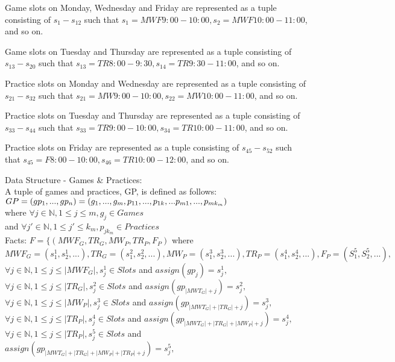 \documentclass[12 pt]{article}        	%
\begin{document}
Game slots on Monday, Wednesday and Friday are represented as a tuple consisting of $s_1 - s_{12}$ such that $s_1 = MWF 9:00 - 10:00, s_2 = MWF 10:00 - 11:00$, and so on.

Game slots on Tuesday and Thursday are represented as a tuple consisting of $s_{13} - s_{20}$ such that $s_{13} = TR 8:00 - 9:30, s_{14} = TR 9:30 - 11:00$, and so on.

Practice slots on Monday and Wednesday are represented as a tuple consisting of $s_{21} - s_{32}$ such that $s_{21} = MW 9:00 - 10:00, s_{22} = MW 10:00 - 11:00$, and so on.

Practice slots on Tuesday and Thursday are represented as a tuple consisting of $s_{33} - s_{44}$ such that $s_{33} = TR 9:00 - 10:00, s_{34} = TR 10:00 - 11:00$, and so on.

Practice slots on Friday are represented as a tuple consisting of $s_{45} - s_{52}$ such that $s_{45} = F 8:00 - 10:00, s_{46} = TR 10:00 - 12:00$, and so on.

Data Structure - Games \& Practices:
\\
A tuple of games and practices, GP, is defined as follows:
$GP = (gp_1, ..., gp_n)\\
= (g_1, ..., g_m, p_{11}, ..., p_{1k}, ... p_{m1}, ..., p_{mk_m})$
\\ where $\forall j \in \mathbb{N}, 1 \le j \le m, g_j \in Games$
\\ and $\forall j' \in \mathbb{N}, 1 \le j' \le k_m, p_{jk_m} \in Practices$
\\
Facts: $F = \{ (MWF_G, TR_G, MW_P, TR_P, F_P)$ where $ MWF_G = (s_1^1, s_2^1, ...), TR_G = (s_1^2, s_2^2, ...), 
MW_P = (s_1^3, s_2^3, ...), 
TR_P = (s_1^4, s_2^4, ...), 
F_P = (S_1^5, S_2^5, ...), $
\\
$\forall j \in \mathbb{N}, 1 \le j \le |MWF_G|, s_j^1 \in Slots$ and $assign(gp_j) = s_j^1,$ \\
$\forall j \in \mathbb{N}, 1 \le j \le |TR_G|, s_j^2 \in Slots$ and $assign(gp_{|MWT_G|+ j}) = s_j^2,$ \\
$\forall j \in \mathbb{N}, 1 \le j \le |MW_P|, s_j^3 \in Slots$ and $assign(gp_{|MWT_G| + |TR_G| + j}) = s_j^3,$ \\
$\forall j \in \mathbb{N}, 1 \le j \le |TR_P|, s_j^4 \in Slots$ and $assign(gp_{|MWT_G| + |TR_G| + |MW_P| + j}) = s_j^4,$ \\
$\forall j \in \mathbb{N}, 1 \le j \le |TR_P|, s_j^5 \in Slots$ and $assign(gp_{|MWT_G| + |TR_G| + |MW_P| + |TR_P| +  j}) = s_j^5,$ \\
\end{document}
